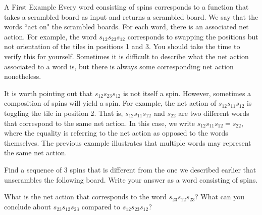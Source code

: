 \begin{section}{A First Example}
Every word consisting of spins corresponds to a function that takes a scrambled board as input and returns a scrambled board. We say that the words ``act on" the scrambled boards. For each word, there is an associated net action. For example, the word $s_{12} s_{23} s_{12}$ corresponds to swapping the positions but not orientation of the tiles in positions 1 and 3.  You should take the time to verify this for yourself. Sometimes it is difficult to describe what the net action associated to a word is, but there is always some corresponding net action nonetheless.

It is worth pointing out that $s_{12} s_{23} s_{12}$ is not itself a spin.  However, sometimes a composition of spins will yield a spin.  For example, the net action of $s_{12} s_{11} s_{12}$ is toggling the tile in position 2.  That is, $s_{12} s_{11} s_{12}$ and $s_{22}$ are two different words that correspond to the same net action. In this case, we write $s_{12} s_{11} s_{12}=s_{22}$, where the equality is referring to the net action as opposed to the words themselves. The previous example illustrates that multiple words may represent the same net action. 

\begin{problem}\label{prob:3_different_spins}
Find a sequence of 3 spins that is different from the one we described earlier that unscrambles the following board. Write your answer as a word consisting of spins.
\begin{center}
\end{center}
\end{problem}

\begin{problem}
What is the net action that corresponds to the word $s_{23} s_{12} s_{23}$? What can you conclude about $s_{23} s_{12} s_{23}$ compared to 
$s_{12} s_{23} s_{12}$?
\end{problem}


\end{section}

